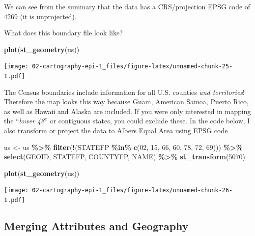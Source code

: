 \documentclass[
]{book}
\newenvironment{Shaded}{\begin{snugshade}}{\end{snugshade}}
\newcommand{\DecValTok}[1]{\textcolor[rgb]{0.00,0.00,0.81}{#1}}
\newcommand{\FunctionTok}[1]{\textcolor[rgb]{0.13,0.29,0.53}{\textbf{#1}}}
\newcommand{\NormalTok}[1]{#1}
\newcommand{\OtherTok}[1]{\textcolor[rgb]{0.56,0.35,0.01}{#1}}
\newcommand{\SpecialCharTok}[1]{\textcolor[rgb]{0.81,0.36,0.00}{\textbf{#1}}}
\newcommand{\StringTok}[1]{\textcolor[rgb]{0.31,0.60,0.02}{#1}}
\begin{document}
We can see from the summary that the data has a CRS/projection EPSG code of 4269 (it is unprojected).

What does this boundary file look like?

\begin{Shaded}
\begin{Highlighting}[]
\FunctionTok{plot}\NormalTok{(}\FunctionTok{st\_geometry}\NormalTok{(us))}
\end{Highlighting}
\end{Shaded}

\texttt{[image: 02-cartography-epi-1\_files/figure-latex/unnamed-chunk-25-1.pdf]}

The Census boundaries include information for all U.S. counties \emph{and territories}! Therefore the map looks this way because Guam, American Samoa, Puerto Rico, as well as Hawaii and Alaska are included. If you were only interested in mapping the ``\emph{lower 48}'' or contiguous states, you could exclude these. In the code below, I also transform or project the data to Albers Equal Area using EPSG code

\begin{Shaded}
\begin{Highlighting}[]
\NormalTok{us }\OtherTok{\textless{}{-}}\NormalTok{ us }\SpecialCharTok{\%\textgreater{}\%}
  \FunctionTok{filter}\NormalTok{(}\SpecialCharTok{!}\NormalTok{(STATEFP }\SpecialCharTok{\%in\%} \FunctionTok{c}\NormalTok{(}\StringTok{\textquotesingle{}02\textquotesingle{}}\NormalTok{, }\StringTok{\textquotesingle{}15\textquotesingle{}}\NormalTok{, }\StringTok{\textquotesingle{}66\textquotesingle{}}\NormalTok{, }\StringTok{\textquotesingle{}60\textquotesingle{}}\NormalTok{, }\StringTok{\textquotesingle{}78\textquotesingle{}}\NormalTok{, }\StringTok{\textquotesingle{}72\textquotesingle{}}\NormalTok{, }\StringTok{\textquotesingle{}69\textquotesingle{}}\NormalTok{))) }\SpecialCharTok{\%\textgreater{}\%}
  \FunctionTok{select}\NormalTok{(GEOID, STATEFP, COUNTYFP, NAME) }\SpecialCharTok{\%\textgreater{}\%}
  \FunctionTok{st\_transform}\NormalTok{(}\DecValTok{5070}\NormalTok{)}

\FunctionTok{plot}\NormalTok{(}\FunctionTok{st\_geometry}\NormalTok{(us))}
\end{Highlighting}
\end{Shaded}

\texttt{[image: 02-cartography-epi-1\_files/figure-latex/unnamed-chunk-26-1.pdf]}

\hypertarget{merging-attributes-and-geography}{%
\subsection{Merging Attributes and Geography}\label{merging-attributes-and-geography}}
\end{document}
